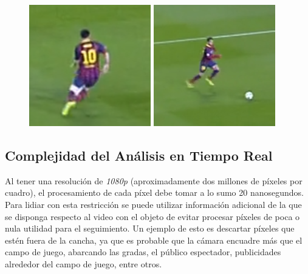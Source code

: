 \begin{figure}[H]
    \begin{minipage}[t]{.5\textwidth}
        \centering
        \includegraphics[width=.4\linewidth]{./images/resize_barcelona2.png}
    \end{minipage}%
    \begin{minipage}[t]{.5\textwidth}
        \centering
        \includegraphics[width=.4\linewidth]{./images/resize_barcelona3.png}
    \end{minipage}
\end{figure}

\subsection{Complejidad del Análisis en Tiempo Real}

Al tener una resolución de \textit{1080p} (aproximadamente dos millones de
píxeles por cuadro), el procesamiento de cada píxel debe tomar a lo sumo 20
nanosegundos. Para lidiar con esta restricción se puede utilizar información
adicional de la que se disponga respecto al video con el objeto de evitar
procesar píxeles de poca o nula utilidad para el seguimiento. Un ejemplo de
esto es descartar píxeles que estén fuera de la cancha, ya que es probable que
la cámara encuadre más que el campo de juego, abarcando las gradas, el público
espectador, publicidades alrededor del campo de juego, entre otros.

